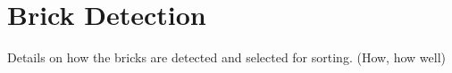\section{Brick Detection \label{sec:brick_detection_sec}}

Details on how the bricks are detected and selected for sorting. (How, how well)
